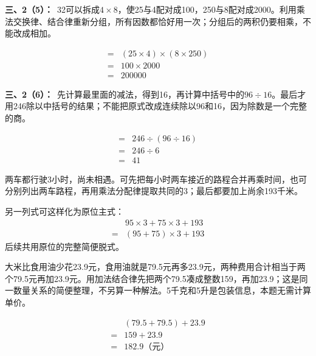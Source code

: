 \documentclass[multi=snippet,border=0pt]{standalone}
\newenvironment{snippet}[3]{\begin{minipage}{#1bp}\color{answerred}\fontsize{#2}{#3}\selectfont\raggedright}{\end{minipage}}
\begin{document}
\begin{snippet}{505}{11.5}{14}\textbf{三、2（5）：}\ 32可以拆成\(4\times8\)，使25与4配对成100，250与8配对成2000。利用乘法交换律、结合律重新分组，所有因数都恰好用一次；分组后的两积仍要相乘，不能改成相加。\end{snippet}
\begin{snippet}{141.4}{10.5}{12.8}\[\begin{aligned}={}&(25\times4)\times(8\times250)\\={}&100\times2000\\={}&200000\end{aligned}\]\end{snippet}
\begin{snippet}{505}{11.5}{14}\textbf{三、2（6）：}\ 先计算最里面的减法，得到16，再计算中括号中的\(96\div16\)。最后才用246除以中括号的结果；不能把原式改成连续除以96和16，因为除数是一个完整的商。\end{snippet}
\begin{snippet}{216.067}{10.5}{12.8}\[\begin{aligned}={}&246\div(96\div16)\\={}&246\div6\\={}&41\end{aligned}\]\end{snippet}
\begin{snippet}{505}{11.5}{14}两车都行驶3小时，尚未相遇。可先把每小时两车接近的路程合并再乘时间，也可分别列出两车路程，再用乘法分配律提取共同的3；最后都要加上尚余193千米。\par 另一列式可这样化为原位主式：\[\begin{aligned}&95\times3+75\times3+193\\={}&(95+75)\times3+193\end{aligned}\]后续共用原位的完整简便脱式。\end{snippet}
\begin{snippet}{505}{11.5}{14}大米比食用油少花23.9元，食用油就是79.5元再多23.9元，两种费用合计相当于两个79.5元再加23.9元。用加法结合律先把两个79.5凑成整数159，再加23.9；这是同一数量关系的简便整理，不另算一种解法。5千克和5升是包装信息，本题无需计算单价。\end{snippet}
\begin{snippet}{189}{10.5}{12.8}\[\begin{aligned}&(79.5+79.5)+23.9\\={}&159+23.9\\={}&182.9\text{（元）}\end{aligned}\]\end{snippet}
\end{document}
